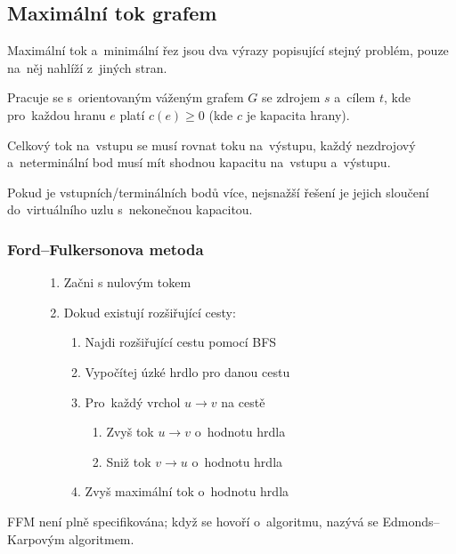 \subsection{Maximální tok grafem}

Maximální tok a~minimální řez jsou dva výrazy popisující stejný problém, pouze na~něj nahlíží z~jiných stran.

Pracuje se s~orientovaným váženým grafem $G$ se zdrojem $s$ a~cílem $t$, kde pro~každou hranu $e$ platí $c(e) \geq 0$ (kde $c$ je kapacita hrany).

Celkový tok na~vstupu se musí rovnat toku na~výstupu, každý nezdrojový a~neterminální bod musí mít shodnou kapacitu na~vstupu a~výstupu.

Pokud je vstupních/terminálních bodů více, nejsnažší řešení je jejich sloučení do~virtuálního uzlu s~nekonečnou kapacitou.

\subsubsection{Ford--Fulkersonova metoda}

\begin{figure}[ht]
\onehalfspacing
\begin{enumerate}
\item Začni s nulovým tokem
\item Dokud existují rozšiřující cesty:
    \begin{enumerate}
    \item Najdi rozšiřující cestu pomocí BFS
    \item Vypočítej úzké hrdlo pro danou cestu
    \item Pro~každý vrchol $u \rightarrow v$ na cestě
        \begin{enumerate}
        \item Zvyš tok $u \rightarrow v$ o~hodnotu hrdla
        \item Sniž tok $v \rightarrow u$ o~hodnotu hrdla
        \end{enumerate}
    \item Zvyš maximální tok o~hodnotu hrdla
    \end{enumerate}
\end{enumerate}
\end{figure}

FFM není plně specifikována; když se hovoří o~algoritmu, nazývá se Edmonds--Karpovým algoritmem.

